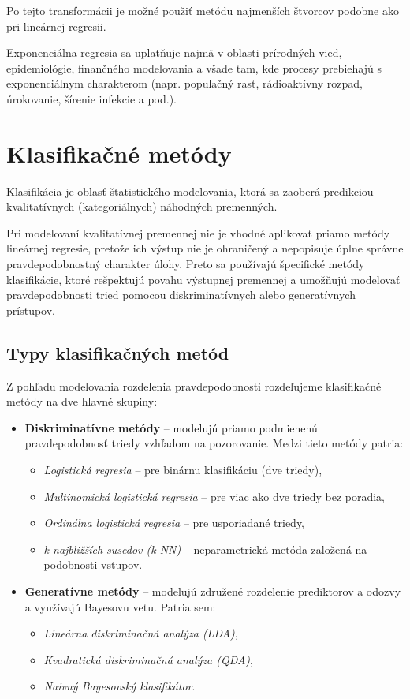 Po tejto transformácii je možné použiť metódu najmenších štvorcov podobne ako pri lineárnej regresii.

Exponenciálna regresia sa uplatňuje najmä v oblasti prírodných vied, epidemiológie, finančného modelovania a všade tam, kde procesy prebiehajú s exponenciálnym charakterom (napr. populačný rast, rádioaktívny rozpad, úrokovanie, šírenie infekcie a pod.).

\section{Klasifikačné metódy}\label{sec:classification}

Klasifikácia je oblasť štatistického modelovania, ktorá sa zaoberá predikciou kvalitatívnych (kategoriálnych) náhodných premenných. 

Pri modelovaní kvalitatívnej premennej nie je vhodné aplikovať priamo metódy lineárnej regresie, pretože ich výstup nie je ohraničený a nepopisuje úplne správne pravdepodobnostný charakter úlohy. Preto sa používajú špecifické metódy klasifikácie, ktoré rešpektujú povahu výstupnej premennej a umožňujú modelovať pravdepodobnosti tried pomocou diskriminatívnych alebo generatívnych prístupov.

\subsection*{Typy klasifikačných metód}

Z pohľadu modelovania rozdelenia pravdepodobnosti rozdeľujeme klasifikačné metódy na dve hlavné skupiny:

\begin{itemize}
  \item \textbf{Diskriminatívne metódy} – modelujú priamo podmienenú pravdepodobnosť triedy vzhľadom na pozorovanie. Medzi tieto metódy patria:
  \begin{itemize}
    \item \textit{Logistická regresia} – pre binárnu klasifikáciu (dve triedy),
    \item \textit{Multinomická logistická regresia} – pre viac ako dve triedy bez poradia,
    \item \textit{Ordinálna logistická regresia} – pre usporiadané triedy,
    \item \textit{k-najbližších susedov (k-NN)} – neparametrická metóda založená na podobnosti vstupov.
  \end{itemize}
  
  \item \textbf{Generatívne metódy} – modelujú združené rozdelenie prediktorov a odozvy a využívajú Bayesovu vetu. Patria sem:
  \begin{itemize}
    \item \textit{Lineárna diskriminačná analýza (LDA)},
    \item \textit{Kvadratická diskriminačná analýza (QDA)},
    \item \textit{Naivný Bayesovský klasifikátor}.
  \end{itemize}
\end{itemize}

